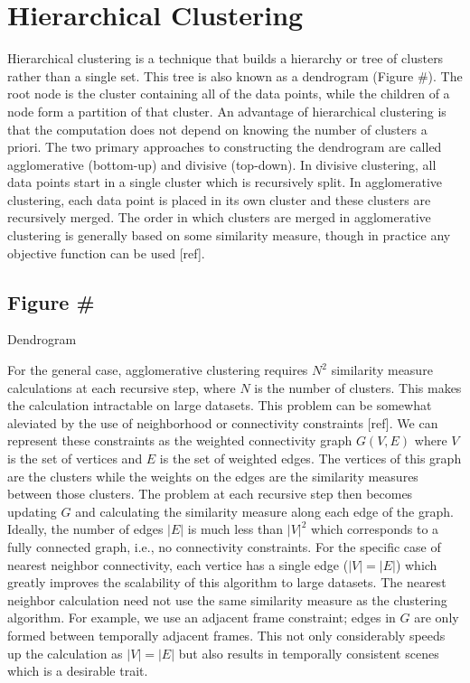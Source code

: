 \documentclass{article}
\begin{document}
\section{Hierarchical Clustering}

Hierarchical clustering is a technique that builds a hierarchy or tree of clusters rather than a single set.
This tree is also known as a dendrogram (Figure \#).
The root node is the cluster containing all of the data points, while the children of a node form a partition of that cluster.
An advantage of hierarchical clustering is that the computation does not depend on knowing the number of clusters a priori.
The two primary approaches to constructing the dendrogram are called agglomerative (bottom-up) and divisive (top-down).
In divisive clustering, all data points start in a single cluster which is recursively split.
In agglomerative clustering, each data point is placed in its own cluster and these clusters are recursively merged.
The order in which clusters are merged in agglomerative clustering is generally based on some similarity measure, though in practice any objective function can be used [ref].

\subsection{Figure \#}
Dendrogram

For the general case, agglomerative clustering requires $N^2$ similarity measure calculations at each recursive step, where $N$ is the number of clusters.
This makes the calculation intractable on large datasets.
This problem can be somewhat aleviated by the use of neighborhood or connectivity constraints [ref].
We can represent these constraints as the weighted connectivity graph $G(V,E)$ where $V$ is the set of vertices and $E$ is the set of weighted edges.
The vertices of this graph are the clusters while the weights on the edges are the similarity measures between those clusters.
The problem at each recursive step then becomes updating $G$ and calculating the similarity measure along each edge of the graph.
Ideally, the number of edges $|E|$ is much less than $|V|^2$ which corresponds to a fully connected graph, i.e., no connectivity constraints.
For the specific case of nearest neighbor connectivity, each vertice has a single edge ($|V|=|E|$) which greatly improves the scalability of this algorithm to large datasets.
The nearest neighbor calculation need not use the same similarity measure as the clustering algorithm.
For example, we use an adjacent frame constraint; edges in $G$ are only formed between temporally adjacent frames.
This not only considerably speeds up the calculation as $|V|=|E|$ but also results in temporally consistent scenes which is a desirable trait.
\end{document}
